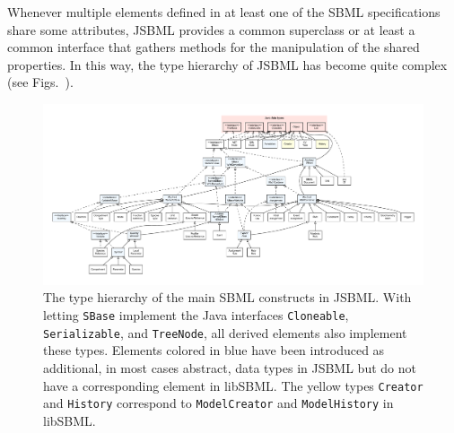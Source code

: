 \documentclass[
  BCOR12mm,
  letterpaper,
  11pt,
  headsepline,
  pointlessnumbers,
  tablecaptionabove,
  onelinecaption,
  headinclude,
  appendixprefix,
  idxtotoc,
  bibtotoc,
  twoside,
  titlepage
]{scrartcl}
\begin{document}
Whenever multiple elements defined in at least one of the SBML
specifications share some
attributes, JSBML provides a common superclass or at
least a common interface that gathers methods for the manipulation of the shared
properties. In this way, the type hierarchy of JSBML has become quite complex (see
Figs.~).
\begin{figure}
\centering
\includegraphics[width=\textwidth]{img/FullTypeHierarchy.pdf}
\caption[The type hierarchy of the main SBML
constructs in JSBML]{The type hierarchy of the main SBML
constructs in JSBML. With letting \texttt{SBase} implement the Java interfaces
\texttt{Cloneable}, \texttt{Serializable}, and \texttt{TreeNode}, all derived
elements also implement these types. Elements colored in blue have been
introduced as additional, in most cases abstract, data types in JSBML but do not
have a corresponding element in libSBML. The yellow types \texttt{Creator} and
\texttt{History} correspond to \texttt{ModelCreator} and \texttt{ModelHistory}
in libSBML.}
\label{fig:TypeHierarchy}
\end{figure}
\end{document}
